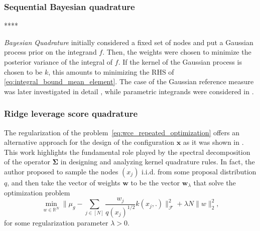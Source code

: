 \documentclass[twoside,11pt]{book}
\numberwithin{theorem}{chapter}
\numberwithin{definition}{chapter}
\numberwithin{proposition}{chapter}
\numberwithin{corollary}{chapter}
\numberwithin{example}{chapter}
\numberwithin{lemma}{chapter}
\numberwithin{assumption}{chapter}
\begin{document}
\subsubsection{Sequential Bayesian quadrature}\label{subsec:bayesian_quadrature}

****

\emph{Bayesian Quadrature} \citep{Lar72} initially considered a fixed set of nodes and put a Gaussian process prior on the integrand $f$. Then, the weights were chosen to minimize the posterior variance of the integral of $f$. If the kernel of the Gaussian process is chosen to be $k$, this amounts to minimizing the RHS of \eqref{eq:integral_bound_mean_element}. The case of the Gaussian reference measure was later investigated in detail \citep{Hag91}, while parametric integrands were considered in \citep{Min00}.

\subsubsection{Ridge leverage score quadrature}
\label{subsec:okq_algebraic_paradigm}
The regularization of the problem~\eqref{eq:wce_repeated_optimization} offers an alternative approach for the design of the configuration $\bm{x}$ as it was shown in \citep{Bac17}.
This work highlights the fundamental role played by the spectral decomposition of the operator $\bm{\Sigma}$ in designing and analyzing kernel quadrature rules.
In fact, the author proposed to sample the nodes $(x_j)$ i.i.d. from some proposal distribution $q$, and then take the vector of weights $\bm{w}$ to be the vector $\bm{w}_{\lambda}$ that solve the optimization problem
\begin{equation}\label{eq:reg_kernel_opt_problem}
\min\limits_{w \in \mathbb{R}^{N}} \Big\| \mu_{g} - \sum\limits_{j \in [N]} \frac{w_{j}}{q(x_{j})^{1/2}} k(x_{j},.) \Big\|_{\mathcal{F}}^{2} + \lambda N \|w\|_{2}^{2},
\end{equation}
for some regularization parameter $\lambda>0$. 

\end{document}
